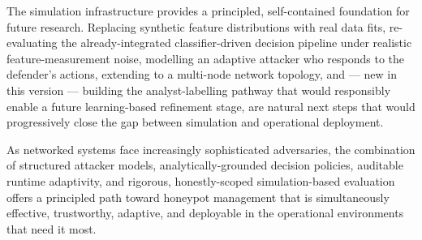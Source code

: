 The simulation infrastructure provides a principled, self-contained
foundation for future research.
Replacing synthetic feature distributions with real data fits, re-evaluating
the already-integrated classifier-driven decision pipeline under realistic
feature-measurement noise, modelling an adaptive attacker who responds to
the defender's actions, extending to a multi-node network topology, and ---
new in this version --- building the analyst-labelling pathway that would
responsibly enable a future learning-based refinement stage, are natural next
steps that would progressively close the gap between simulation and
operational deployment.

As networked systems face increasingly sophisticated adversaries, the
combination of structured attacker models, analytically-grounded decision
policies, auditable runtime adaptivity, and rigorous, honestly-scoped
simulation-based evaluation offers a principled path toward honeypot
management that is simultaneously effective, trustworthy, adaptive, and
deployable in the operational environments that need it most.

